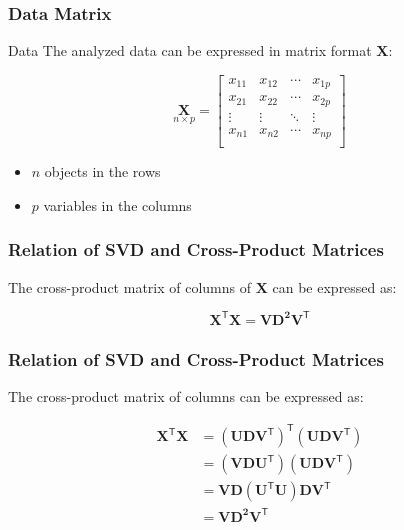 \documentclass[12pt]{beamer}\usepackage[]{graphicx}\usepackage[]{color}
\begin{document}
\begin{frame}
\frametitle{Data Matrix}

\begin{block}{Data}
The analyzed data can be expressed in matrix format $\mathbf{X}$:

\[ \underset{n \times p}{\mathbf{X}} = 
\left[\begin{array}{cccc}
x_{11} & x_{12} & \cdots & x_{1p} \\
x_{21} & x_{22} & \cdots & x_{2p} \\
\vdots & \vdots & \ddots & \vdots \\
x_{n1} & x_{n2} & \cdots & x_{np} \\
\end{array}\right]
\]
\end{block}

\begin{itemize}
 \item $n$ objects in the rows
 \item $p$ variables in the columns
\end{itemize}

\end{frame}


\begin{frame}
\frametitle{Relation of SVD and Cross-Product Matrices}

The cross-product matrix of columns of $\mathbf{X}$ can be expressed as:

{\Large
$$
\mathbf{X^\mathsf{T}X = V D^2 V^\mathsf{T}}
$$
}

\end{frame}


\begin{frame}
\frametitle{Relation of SVD and Cross-Product Matrices}

The cross-product matrix of columns can be expressed as:

{\large
\begin{align*}
\mathbf{X^\mathsf{T} X} &= (\mathbf{U D V^\mathsf{T}})^\mathsf{T} (\mathbf{U D V^\mathsf{T}}) \\
&= (\mathbf{V D U^\mathsf{T}}) (\mathbf{U D V^\mathsf{T}}) \\
&= \mathbf{V D} (\mathbf{U^\mathsf{T}} \mathbf{U}) \mathbf{D V^\mathsf{T}} \\
&= \mathbf{V D^2 V^\mathsf{T}}
\end{align*}
}

\end{frame}
\end{document}
